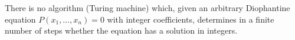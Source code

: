 There is no algorithm (Turing machine) which, given an arbitrary Diophantine equation $P(x_1, \ldots, x_n) = 0$ with integer coefficients, determines in a finite number of steps whether the equation has a solution in integers.
